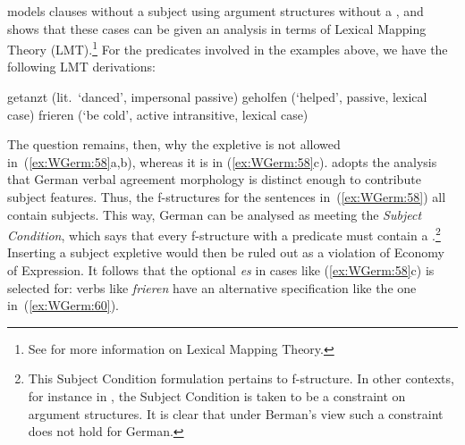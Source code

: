 \documentclass[output=paper,hidelinks]{langscibook}
\begin{document}
\citeauthor{Berman2003} models clauses without a subject using
argument structures without a \SUBJ, and shows that these cases can be given
an analysis in terms of Lexical Mapping Theory (LMT).\footnote{See
 for more information
on Lexical Mapping Theory.} For the
predicates involved in the examples above, we have the following LMT
derivations:
%
\begin{exe}
  \ex
  \begin{xlist}
    \ex getanzt  \hfill (lit.\ `danced', impersonal passive)
    \ex geholfen  \hfill (`helped', passive, lexical case)
    \ex frieren  \hfill (`be cold', active intransitive, lexical case)
  \end{xlist}
\end{exe}
%
The question remains, then, why the expletive is not allowed
in~(\ref{ex:WGerm:58}a,b), whereas it is in
(\ref{ex:WGerm:58}c). \citeauthor{Berman2003} adopts the analysis that
German verbal agreement morphology is distinct enough to contribute
subject features. Thus, the f-structures for the sentences
in~(\ref{ex:WGerm:58}) all contain subjects. This way, German can be analysed
as meeting the \textit{Subject Condition}, which says that every
f-structure with a predicate must contain a \SUBJ.\footnote{This
Subject Condition formulation pertains to f-structure. In other
contexts, for instance in \citet[§14.4]{BresnanEtAl2016}, the
Subject Condition is taken to be a constraint on argument
structures. It is clear that under Berman's view such a constraint
does not hold for German.} Inserting a subject expletive would then be
ruled out as a violation of Economy of Expression. It follows that
the optional \textit{es} in cases like (\ref{ex:WGerm:58}c) is selected for:
verbs like \textit{frieren} have an alternative specification like the
one in~(\ref{ex:WGerm:60}).
%
\begin{exe}
  \ex\label{ex:WGerm:60} 
\end{exe}
\end{document}
